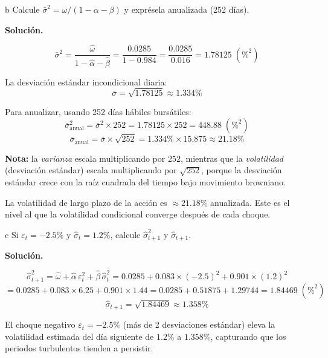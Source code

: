 \documentclass[11pt,a4paper]{article}
\newcommand{\sigmabar}{\bar{\sigma}^2}
\newcommand{\eps}{\varepsilon}
\begin{document}
\begin{cajaInciso}{b}
Calcule $\sigmabar = \omega/(1 - \alpha - \beta)$ y exprésela anualizada (252 días).
\end{cajaInciso}

\textbf{Solución.}

\[
\sigmabar = \frac{\hat{\omega}}{1 - \hat{\alpha} - \hat{\beta}} = \frac{0.0285}{1 - 0.984} = \frac{0.0285}{0.016} = 1.78125 \; (\%^2)
\]

La desviación estándar incondicional diaria:
\[
\bar{\sigma} = \sqrt{1.78125} \approx 1.334\%
\]

Para anualizar, usando 252 días hábiles bursátiles:
\[
\sigmabar_{\text{anual}} = \sigmabar \times 252 = 1.78125 \times 252 = 448.88 \; (\%^2)
\]
\[
\bar{\sigma}_{\text{anual}} = \bar{\sigma} \times \sqrt{252} = 1.334\% \times 15.875 \approx 21.18\%
\]

\textbf{Nota:} la \emph{varianza} escala multiplicando por $252$, mientras que la \emph{volatilidad} (desviación estándar) escala multiplicando por $\sqrt{252}$, porque la desviación estándar crece con la raíz cuadrada del tiempo bajo movimiento browniano.

\begin{cajaHallazgo}
La volatilidad de largo plazo de la acción es $\approx 21.18\%$ anualizada. Este es el nivel al que la volatilidad condicional converge después de cada choque.
\end{cajaHallazgo}

\begin{cajaInciso}{c}
Si $\eps_t = -2.5\%$ y $\hat{\sigma}_t = 1.2\%$, calcule $\hat{\sigma}^2_{t+1}$ y $\hat{\sigma}_{t+1}$.
\end{cajaInciso}

\textbf{Solución.}

\[
\hat{\sigma}^2_{t+1} = \hat{\omega} + \hat{\alpha}\, \eps_t^2 + \hat{\beta}\, \hat{\sigma}_t^2
= 0.0285 + 0.083 \times (-2.5)^2 + 0.901 \times (1.2)^2
\]
\[
= 0.0285 + 0.083 \times 6.25 + 0.901 \times 1.44
= 0.0285 + 0.51875 + 1.29744
= 1.84469 \; (\%^2)
\]
\[
\hat{\sigma}_{t+1} = \sqrt{1.84469} \approx 1.358\%
\]

El choque negativo $\eps_t = -2.5\%$ (más de 2 desviaciones estándar) eleva la volatilidad estimada del día siguiente de $1.2\%$ a $1.358\%$, capturando que los periodos turbulentos tienden a persistir.
\end{document}
